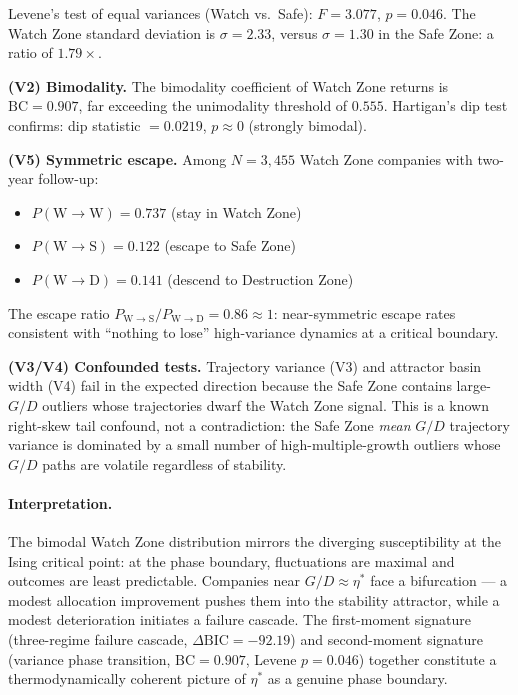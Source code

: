 \documentclass[11pt]{article}
\theoremstyle{remark}
\begin{document}
\noindent
Levene's test of equal variances (Watch vs.\ Safe): $F = 3.077$, $p = 0.046$.
The Watch Zone standard deviation is $\sigma = 2.33$, versus $\sigma = 1.30$ in the Safe Zone:
a ratio of $1.79\times$.

\medskip
\textbf{(V2) Bimodality.}
The bimodality coefficient of Watch Zone returns is $\mathrm{BC} = 0.907$, far exceeding the
unimodality threshold of $0.555$.  Hartigan's dip test confirms: dip statistic $= 0.0219$,
$p \approx 0$ (strongly bimodal).

\medskip
\textbf{(V5) Symmetric escape.}
Among $N = 3{,}455$ Watch Zone companies with two-year follow-up:
\begin{itemize}[itemsep=2pt]
  \item $P(\text{W} \to \text{W}) = 0.737$ (stay in Watch Zone)
  \item $P(\text{W} \to \text{S}) = 0.122$ (escape to Safe Zone)
  \item $P(\text{W} \to \text{D}) = 0.141$ (descend to Destruction Zone)
\end{itemize}
The escape ratio $P_{\mathrm{W \to S}} / P_{\mathrm{W \to D}} = 0.86 \approx 1$: near-symmetric
escape rates consistent with ``nothing to lose'' high-variance dynamics at a critical boundary.

\medskip
\textbf{(V3/V4) Confounded tests.}
Trajectory variance (V3) and attractor basin width (V4) fail in the expected direction because
the Safe Zone contains large-$G/D$ outliers whose trajectories dwarf the Watch Zone signal.
This is a known right-skew tail confound, not a contradiction: the Safe Zone \emph{mean}
$G/D$ trajectory variance is dominated by a small number of high-multiple-growth outliers whose
$G/D$ paths are volatile regardless of stability.

\paragraph{Interpretation.}
The bimodal Watch Zone distribution mirrors the diverging susceptibility at the Ising critical
point: at the phase boundary, fluctuations are maximal and outcomes are least predictable.
Companies near $G/D \approx \eta^*$ face a bifurcation --- a modest allocation improvement
pushes them into the stability attractor, while a modest deterioration initiates a failure
cascade.  The first-moment signature (three-regime failure cascade, $\Delta\mathrm{BIC}
= -92.19$) and second-moment signature (variance phase transition, $\mathrm{BC} = 0.907$,
Levene $p = 0.046$) together constitute a thermodynamically coherent picture of $\eta^*$ as
a genuine phase boundary.
\end{document}
